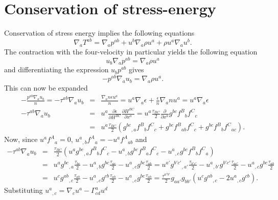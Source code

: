 \section{Conservation of stress-energy}

Conservation of stress energy implies the following equations
\begin{equation}
\nabla_a T^{ab} = \nabla_a p^{ab} + u^b \nabla_a \rho u^a + \rho u^a \nabla_a u^b.
\end{equation}
The contraction with the four-velocity in particular yields the following equation
\begin{equation}
u_b\nabla_ap^{ab} = \nabla_a \rho u^a
\end{equation}
and differentiating the expression $u_bp^{ab}$ gives
\begin{equation}
-p^{ab}\nabla_au_b = \nabla_a \rho u^a.
\end{equation}
This can now be expanded
\begin{eqnarray}
-\frac{p^{ab}\nabla_au_b}{n} = -\tau^{ab}\nabla_au_b & = &  \frac{\nabla_a n\epsilon u^a}{n} = u^a \nabla_a \epsilon +  \frac{\epsilon}{n}\nabla_a nu^a = u^a \nabla_a \epsilon \\
-\tau^{ab}\nabla_au_b & = &  u^a \frac{\partial \epsilon}{\partial H^{BC}}\frac{\partial H^{BC}}{\partial x^a} = u^a\frac{\tau_{BC}}{2}\frac{\partial }{\partial x^a} g^{bc}f^B{}_bf^C{}_c \\
& = &u^a\frac{\tau_{BC}}{2} \left( g^{bc}{}_{,a}f^B{}_bf^C{}_c  + g^{bc}f^B{}_{ab}f^C{}_c + g^{bc}f^B{}_bf^C{}_{ac}\right).
\end{eqnarray}
Now, since $u^af^A{}_a = 0$, $u^a{}_{,b}f^A{}_a = - u^af^A{}_{ab}$ and
\begin{eqnarray}
-\tau^{ab}\nabla_au_b & = &  \frac{\tau_{BC}}{2} \left( u^a g^{bc}{}_{,a}f^B{}_bf^C{}_c  - u^a{}_{,b}g^{bc}f^B{}_af^C{}_c - u^a{}_{,c}g^{bc}f^B{}_bf^C{}_a\right) \\
& = &  u^a g^{bc}{}_{,a}\frac{\tau_{bc}}{2}  - u^a{}_{,b}g^{bc}\frac{\tau_{ac}}{2} - u^a{}_{,c}g^{bc}\frac{\tau_{ab}}{2} = u^{a'} g^{b'c'}{}_{,a'}\frac{\tau_{b'c'}}{2}  - u^a{}_{,b'}g^{b'c'}\frac{\tau_{ac'}}{2} - u^a{}_{,c}g^{bc}\frac{\tau_{ab}}{2} \\
& = & u^{c} g^{ab}{}_{,c}\frac{\tau_{ab}}{2}  - u^a{}_{,c}g^{cb}\frac{\tau_{ab}}{2} - u^a{}_{,c}g^{bc}\frac{\tau_{ab}}{2} = \frac{\tau^{a'b'}}{2} g_{aa'}g_{bb'}\left( u^{c} g^{ab}{}_{,c}  - 2u^a{}_{,c}g^{cb}\right).
\end{eqnarray}
Substituting $u^a{}_{,c} = \nabla_c u^a - \Gamma^a_{cd}u^d$

